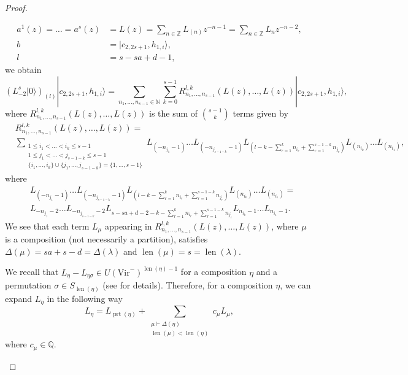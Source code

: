 \documentclass[a4paper, 12pt, reqno]{amsart}
\theoremstyle{remark}
\DeclareMathOperator{\len}{len}
\DeclareMathOperator{\prt}{prt}
\newcommand{\vac}{{|0\rangle}}
\newcommand{\Vir}{{\mathrm{Vir}}}
\begin{document}
\begin{proof}
\begin{enumerate}
\begin{align*}
      a^1(z) = \dots = a^s(z) &= L(z) = \sum_{n \in \mathbb{Z}}L_{(n)}z^{-n - 1} = \sum_{n \in \mathbb{Z}}L_nz^{-n - 2}, \\
      b &= |c_{2, 2s + 1}, h_{1, i}\rangle, \\
      l &= s - sa + d - 1,
    \end{align*}
    we obtain
    \begin{equation}
      \label{eq:8}
      (L_{-2}^s\vac)_{(l)}|c_{2, 2s + 1}, h_{1, i}\rangle = \sum_{n_1, \dots, n_{s - 1} \in \mathbb{N}}\sum_{k = 0}^{s - 1}R^{l, k}_{n_1, \dots, n_{s - 1}}(L(z), \dots, L(z))|c_{2, 2s + 1}, h_{1, i}\rangle,
    \end{equation}
    where $R^{l, k}_{n_1, \dots, n_{s - 1}}(L(z), \dots, L(z))$ is the sum of $\binom{s - 1}{k}$ terms given by
    \begin{align*}
      &R^{l, k}_{n_1, \dots, n_{s - 1}}(L(z), \dots, L(z)) = \\
      &\sum_{\substack{1 \le i_1 < \dots < i_k \le s - 1 \\ 1 \le j_1 < \dots < j_{s - 1 - k} \le s - 1 \\ \{i_1, \dots, i_k\} \cup \{j_1, \dots, j_{s - 1 - k}\} = \{1, \dots, s - 1\}}}L_{(-n_{j_1} - 1)}\dots L_{(-n_{j_{s - 1 - k}} - 1)}L_{(l - k - \sum_{r = 1}^kn_{i_r} + \sum_{r = 1}^{s - 1 - k}n_{j_r})}L_{(n_{i_k})}\dots L_{(n_{i_1})},
    \end{align*}
    where
    \begin{align*}
      &L_{(-n_{j_1} - 1)}\dots L_{(-n_{j_{s - 1 - k}} - 1)}L_{(l - k - \sum_{r = 1}^kn_{i_r} + \sum_{r = 1}^{s - 1 - k}n_{j_r})}L_{(n_{i_k})}\dots L_{(n_{i_1})} = \\
      &L_{-n_{j_1} - 2}\dots L_{-n_{j_{s - 1 - k}} - 2}L_{s - sa + d - 2 - k - \sum_{r = 1}^kn_{i_r} + \sum_{r = 1}^{s - 1 - k}n_{j_r}}L_{n_{i_k} - 1}\dots L_{n_{i_1} - 1}.
    \end{align*}
    We see that each term $L_\mu$ appearing in $R^{l, k}_{n_1, \dots, n_{s - 1}}(L(z), \dots, L(z))$, where $\mu$ is a composition (not necessarily a partition), satisfies $\Delta(\mu) = sa + s - d = \Delta(\lambda)$ and $\len(\mu) = s = \len(\lambda)$.

    We recall that $L_\eta - L_{\eta\sigma} \in U(\Vir^-)^{\len(\eta) - 1}$ for a composition $\eta$ and a permutation $\sigma \in S_{\len(\eta)}$ (see \cite[Lemma 2.1.5]{dixmier_enveloping_1996} for details).
    Therefore, for a composition $\eta$, we can expand $L_\eta$ in the following way
    \begin{equation*}
      L_\eta = L_{\prt(\eta)} + \sum_{\substack{\mu \vdash \Delta(\eta) \\ \len(\mu) < \len(\eta)}}c_\mu L_\mu,
    \end{equation*}
    where $c_\mu \in \mathbb{Q}$.


\end{enumerate}
\end{proof}
\end{document}
